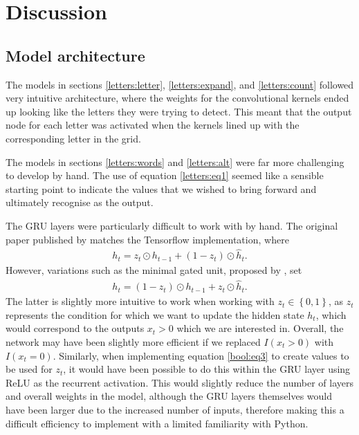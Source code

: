 \documentclass{somasmsc}
\begin{document}
\section{Discussion}

\subsection{Model architecture}

The models in sections \ref{letters:letter}, \ref{letters:expand}, and \ref{letters:count} followed very intuitive architecture, where the weights for the convolutional kernels ended up looking like the letters they were trying to detect. This meant that the output node for each letter was activated when the kernels lined up with the corresponding letter in the grid.

The models in sections \ref{letters:words} and \ref{letters:alt} were far more challenging to develop by hand. The use of equation \ref{letters:eq1} seemed like a sensible starting point to indicate the values that we wished to bring forward and ultimately recognise as the output.

The GRU layers were particularly difficult to work with by hand. The original paper published by \citeauthor{DBLP:journals/corr/ChoMGBSB14} matches the Tensorflow implementation, where 
\begin{align*}
h_t = z_t \odot h_{t-1} + \left(1 - z_t\right) \odot \hat{h}_t.
\end{align*}
However, variations such as the minimal gated unit, proposed by \citet{heck2017simplified}, set
\begin{align*}
h_t = \left(1 - z_t\right) \odot h_{t-1} + z_t \odot \hat{h}_t.
\end{align*}
The latter is slightly more intuitive to work when working with $z_t \in \left\{0, 1\right\}$, as $z_t$ represents the condition for which we want to update the hidden state $h_t$, which would correspond to the outputs $x_t > 0$ which we are interested in. Overall, the network may have been slightly more efficient if we replaced $I\left(x_t > 0\right)$ with $I\left(x_t = 0\right)$. Similarly, when implementing equation \ref{bool:eq3} to create values to be used for $z_t$, it would have been possible to do this within the GRU layer using ReLU as the recurrent activation. This would slightly reduce the number of layers and overall weights in the model, although the GRU layers themselves would have been larger due to the increased number of inputs, therefore making this a difficult efficiency to implement with a limited familiarity with Python.
\end{document}
